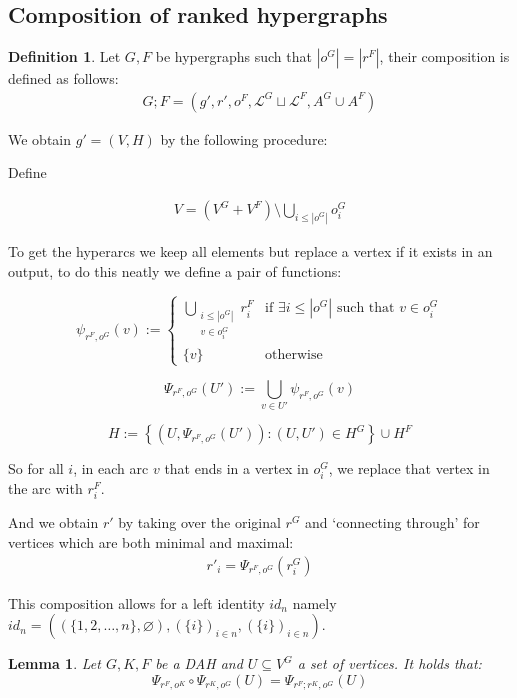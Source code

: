 \documentclass[12pt]{article}
\newtheorem{lemma}[theorem]{Lemma}
\theoremstyle{definition}
\newtheorem{definition}[theorem]{Definition}
\newcommand{\1}{\mathbbm{1}}
\renewcommand{\L}{\mathcal{L}}
\newcommand{\seq}{;}
\begin{document}
\subsection{Composition of ranked hypergraphs}
\begin{definition}\label{def_seq_comp}
Let $G, F$ be hypergraphs such that $|o^G| = |r^F|$, their composition is defined as follows:
\begin{align}
    G\seq F = (g', r', o^F, \L^G\sqcup \L^F, A^G\cup A^F)
\end{align}

We obtain $g' = (V,H)$ by the following procedure:

Define 

\begin{align*}
    V = (V^G + V^F) \setminus \bigcup_{i\leq |o^G|}o^G_i
\end{align*}

To get the hyperarcs we keep all elements but replace a vertex if it exists in an output, to do this neatly we define a pair of functions:

\[
\psi_{r^F, o^G}(v) := 
\begin{cases}
\displaystyle\bigcup_{\substack{i\leq |o^G| \\ v \in o^G_i}} r^F_i & \text{if } \exists i \leq |o^G| \text{ such that } v \in o^G_i \\
\{v\} & \text{otherwise}
\end{cases}
\]

\[
\Psi_{r^F, o^G}(U') := \bigcup_{v \in U'} \psi_{r^F, o^G}(v)
\]

\[
H := \left\{ \left(U, \Psi_{r^F, o^G}(U')\right) : (U, U') \in H^G \right\} \cup H^F
\]

So for all $i$, in each arc $v$ that ends in a vertex in $o_i^G$, we replace that vertex in the arc with $r_i^F$. 

And we obtain $r'$ by taking over the original $r^G$ and `connecting through' for vertices which are both minimal and maximal:
\begin{align*}
    r'_i = \Psi_{r^F, o^G}(r^G_i)
\end{align*}
\end{definition}

This composition allows for a left identity $id_n$ namely $id_n = ((\{1,2,\dots,n\}, \varnothing), (\{i\})_{i\in n}, (\{i\})_{i\in n})$.\vspace{5pt}

\begin{lemma}\label{lem:psieq}
    Let $G,K,F$ be a DAH and $U\subseteq V^G$ a set of vertices. It holds that:
    \[
        \Psi_{r^F, o^K}\circ \Psi_{r^K, o^G}(U) = \Psi_{r^F\seq r^K, o^G}(U)
    \]
\end{lemma}
\end{document}
